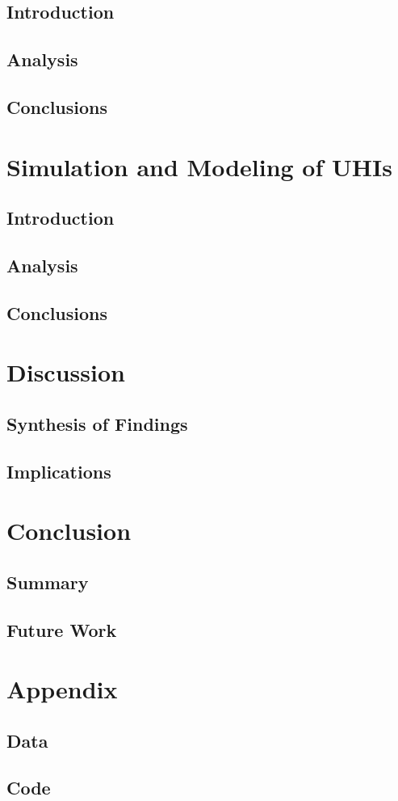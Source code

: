 \documentclass[a4paper, english]{article}
\begin{document}
    \subsection{Introduction}
    \subsection{Analysis}
    \subsection{Conclusions}

\section{Simulation and Modeling of UHIs}
    \subsection{Introduction}
    \subsection{Analysis}
    \subsection{Conclusions}

\section{Discussion}
    \subsection{Synthesis of Findings}
    \subsection{Implications}

\section{Conclusion}
    \subsection{Summary}
    \subsection{Future Work}

\section{Appendix}
    \subsection{Data}
    \subsection{Code}


\newpage
\printbibliography
\end{document}
